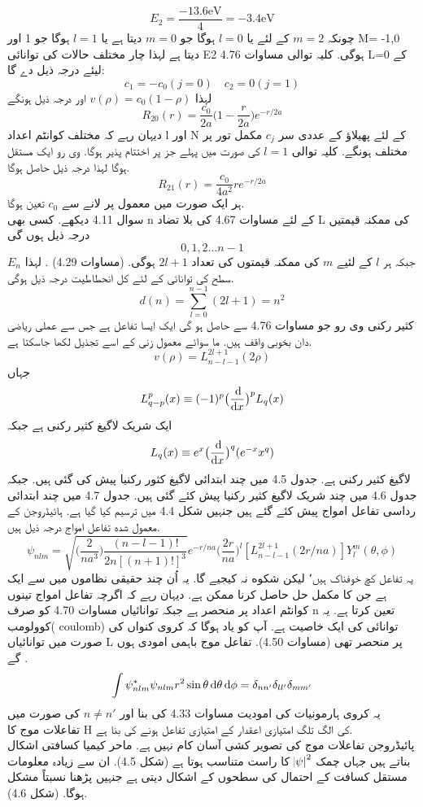 \documentclass{book}
\begin{document}
\[E_{2}=\frac{-13.6\text{eV}}{4}=-3.4\text{eV}\]
چونکہ
 \(m=2\) 
کے لئے یا 
\(l=0\) 
ہوگا جو
\( m=0\) 
دیتا ہے يا
 \(l=1\) 
ہوگا جو 1 اور M= -1,0 دیتا ہے لہذا چار مختلف حالات کی توانائی E2 ہوگی. کلیہ توالی مساوات 4.76  L=0 کے لیئے درجہ ذیل دے گا:
\[c_{1}=-c_{0} (j=0) \quad c_{2}=0 (j=1)\]
لہذا
\(v(\rho)=c_{0}(1-\rho)\)
اور درجہ ذیل ہونگے
 \[R_{20}(r)=\frac{c_{0}}{2a}\big(1-\frac{r}{2a}\big)e^{-r/2a}\]
دیہان رہے کہ مختلف کوانٹم اعداد l اور N کے لئے پھیلاؤ کے عددی سر
 \(c_{j}\)
 مکمل تور پر مختلف ہونگے. کلیہ توالی
  \(l= 1\)
  کی صورت میں پہلے جز پر اختتام پذیر ہوگا. وی رو ایک مستقل ہوگا لہذا درجہ ذیل حاصل ہوگا.
   \[R_{21}(r)=\frac{c_{0}}{4a^{2}}re^{-r/2a}\]
ہر ایک صورت میں معمول پر لانے سے
 \(c_{0}\) 
تعین ہوگا.\\
سوال 4.11 دیکھے. کسی بھی n کے لئے مساوات 4.67 کی بلا تضاد L کی ممکنہ قیمتیں درجہ ذیل ہوں گی 
\[0,1,2\dotsc n-1\]
جبکہ ہر
 \(l \)
کے لئیے 
\(m\)
 کی ممکنہ قیمتوں کی تعداد
 \( 2l+1\) 
 ہوگی. (مساوات 4.29) . لہذا
  \(E_{n}\)
  سطح کی توانائی کے لئے کل انحطاطيت درجہ ذیل ہوگی.
\[d(n)=\sum_{l=0}^{n-1}(2l+1)=n^{2}\]
كثير رکنی وی رو جو مساوات 4.76 سے حاصل ہو گی ایک ایسا تفاعل ہے جس سے عملی ریاضی دان بخوبی واقف ہیں. ما سوائے معمول زنی کے اسے تجذيل لکھا جاسکتا ہے.
 \[v(\rho)=L_{n-l-1}^{2l+1}(2\rho)\]
 جہاں
  \[L_{q-p}^{p}(x)\equiv(-1)^{p}\big(\frac{\dif}{\dif{x}}\big)^{p}L_{q}(x)\] 
 ایک شریک لاگیغ  كثير رکنی ہے جبکہ 
\[ L_{q}(x)\equiv e^{x}\big(\frac{\dif}{\dif{x}}\big)^{q}(e^{-x}x^{q})\]
 لاگیغ كثير رکنی ہے. جدول 4.5 میں چند ابتدائی لاگيغ كثور رکنیا پیش کی گئی ہیں.  جبکہ جدول 4.6 میں چند شریک لاگيغ كثير رکنیا پیش کئے گئی ہیں. جدول 4.7 میں چند ابتدائی رداسی تفاعل امواج پیش کئے گئے ہیں جنہیں شکل 4.4 میں ترسیم کیا گیا ہے. ہائیڈروجن کے معمول شده تفاعل امواج درجہ ذیل ہیں.
  \[\boxed{\psi_{nlm}=\sqrt{\big(\frac{2}{na^{3}}\big)\frac{(n-l-1)!}{2n[(n+1)!]^{3}}}e^{-r/na}\big(\frac{2r}{na}\big)^{l}[L_{n-l-1}^{2l+1}(2r/na)]Y_{l}^{m}(\theta,\phi)}\]
یہ تفاعل کچ خوفناک ہیں٬ ليكن شكوه نہ کیجیے گا. یہ اُن چند حقیقی نظاموں میں سے ایک ہے جن کا مکمل حل حاصل کرنا ممکن ہے.  دیہان رہے کہ اگرچہ تفاعل امواج تینوں کوانٹم اعداد پر منحصر ہے جبکہ توانائیاں مساوات 4.70 کو صرف n تعین کرتا ہے. یہ کوولومب( coulomb) توانائی کی ایک خاصیت ہے. آپ کو یاد ہوگا کہ کروی كنواں کی صورت میں توانائیاں L پر منحصر تھی (مساوات 4.50).
تفاعل موج باہمی امودی ہوں گے 
.\[\int\psi_{nlm}^{*}\psi_{nlm}r^{2}\sin{\theta}\dif{\theta}\dif{\phi}=\delta_{nn'}\delta_{ll'}\delta_{mm'}\]
 یہ کروی ہارمونیات کی امودیت مساوات 4.33 کی بنا اور
\(n\neq n'\)
کی صورت میں تفاعلات موج کا H کی الگ تلگ امتیازی اعقدار کے امتیازی تفاعل ہونے کی بنا ہے. \\
پائیڈروجن تفاعلات موج کی تصویر کشی آسان کام نہیں ہے. ماحر کیمیا کسافتی اشکال بناتے ہیں جہاں چمک
\(\abs{\psi}^{2}\)
کا راست متناسب ہوتا ہے (شکل 4.5). ان سے زیادہ معلومات مستقل كسافت کے احتمال کی سطحوں کے اشکال دیتی ہے جنہیں پڑھنا نسبتاً مشکل ہوگا. (شکل 4.6).\\
\end{document}
